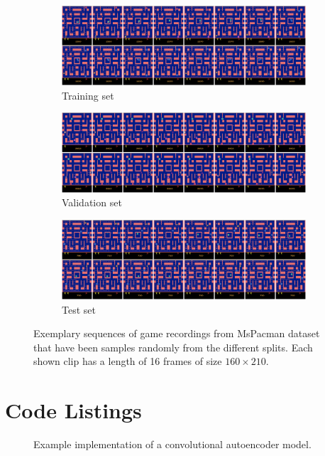 \begin{figure}[h!tb]
\centering
\begin{subfigure}{1.0\textwidth}
  \centering
  \includegraphics[width=1.0\linewidth]{figures/ds/pac_train_full.png}
  \caption{Training set}
  \label{fig:pac_train_full}
  \vspace{.1cm}
\end{subfigure}
\begin{subfigure}{1.0\textwidth}
  \centering
  \includegraphics[width=1.0\linewidth]{figures/ds/pac_valid_full.png}
  \caption{Validation set}
  \label{fig:pac_valid_full}
  \vspace{.1cm}
\end{subfigure}
\begin{subfigure}{1.0\textwidth}
  \centering
  \includegraphics[width=1.0\linewidth]{figures/ds/pac_test_full.png}
  \caption{Test set}
  \label{fig:pac_test_full}
\end{subfigure}
\caption[MsPacman Full Image Samples]{Exemplary sequences of game recordings from MsPacman dataset that have been samples randomly from the different splits. Each shown clip has a length of \num{16} frames of size $160 \times 210$.}
\label{fig:pacman_full}
\end{figure}



\clearpage
\section{Code Listings}

\begin{figure}[h!tb]
  
  \caption[Code: Convolutional Autoencoder]{Example implementation of a convolutional autoencoder model.}\label{code:model}
\end{figure}





